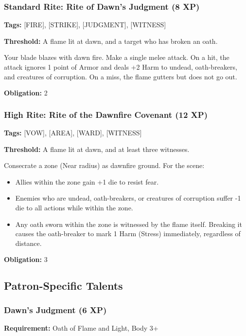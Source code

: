 \subsubsection{Standard Rite: Rite of Dawn's Judgment (8 XP)}

\textbf{Tags:} [FIRE], [STRIKE], [JUDGMENT], [WITNESS]

\textbf{Threshold:} A flame lit at dawn, and a target who has broken an oath.

Your blade blazes with dawn fire. Make a single melee attack. On a hit, the attack ignores 1 point of Armor and deals +2 Harm to undead, oath-breakers, and creatures of corruption. On a miss, the flame gutters but does not go out.

\textbf{Obligation:} 2

\subsubsection{High Rite: Rite of the Dawnfire Covenant (12 XP)}

\textbf{Tags:} [VOW], [AREA], [WARD], [WITNESS]

\textbf{Threshold:} A flame lit at dawn, and at least three witnesses.

Consecrate a zone (Near radius) as dawnfire ground. For the scene:
\begin{itemize}
\item Allies within the zone gain +1 die to resist fear.
\item Enemies who are undead, oath-breakers, or creatures of corruption suffer -1 die to all actions while within the zone.
\item Any oath sworn within the zone is witnessed by the flame itself. Breaking it causes the oath-breaker to mark 1 Harm (Stress) immediately, regardless of distance.
\end{itemize}

\textbf{Obligation:} 3

\subsection{Patron-Specific Talents}

\subsubsection{Dawn's Judgment (6 XP)}

\textbf{Requirement:} Oath of Flame and Light, Body 3+

